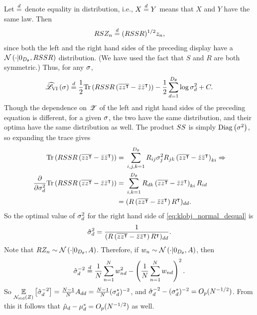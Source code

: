Let $\dequal$ denote equality in distribution, i.e., $X \dequal Y$ means that
$X$ and $Y$ have the same law.  Then
%
\begin{align*}
%
R S \z_n \dequal (RSSR)^{1/2} z_n,
%
\end{align*}
%
since both the left and the right hand sides of the preceding display have a
$\normal{\cdot}{\zerod[\thetadim], RSSR}$ distribution.  (We have used the fact that
$S$ and $R$ are both symmetric.)  Thus, for any $\etasigma$,
%
\begin{align}\label{eq:klobj_normal_dequal}
%
\klobj{\etasigma} \dequal
\frac{1}{2} \trace{R \sigmat \sigmat R \left(\zzbar - \zbar \zbar^\trans\right)}
-\frac{1}{2}\sumd \log \etasigma[d]^2 + \const.
%
\end{align}
%
Though the dependence on $\Z$ of the left and right hand sides of the preceding
equation is different, for a given $\etasigma$, the two have the same
distribution, and their optima have the same distribution as well.
The product $\sigmat \sigmat$ is simply $\diag{\etasigma^2}$, so
expanding the trace gives
%
\begin{align*}
%
\trace{R \sigmat \sigmat R \left(\zzbar - \zbar \zbar^\trans\right)}
={}&
\sum_{i,j,k=1}^{\thetadim} R_{ij} \etasigma[j]^2 R_{jk}
 \left(\zzbar - \zbar \zbar^\trans\right)_{ki} \Rightarrow \\
\frac{\partial}{\partial \etasigma[d]^2}
    \trace{R \sigmat \sigmat R \left(\zzbar - \zbar \zbar^\trans\right)}
    ={}&
\sum_{i,k=1}^{\thetadim} R_{dk}
     \left(\zzbar - \zbar \zbar^\trans\right)_{ki} R_{id}
    \\ ={}&
     (R \left(\zzbar - \zbar \zbar^\trans\right) R^\trans)_{dd}.
%
%
\end{align*}
%
So the optimal value of $\etasigma[d]^2$ for the right hand side of
\cref{eq:klobj_normal_dequal} is
%
\begin{align*}
%
\etasigmahat[d]^2 =
\frac{1}{(R \left(\zzbar - \zbar \zbar^\trans\right) R^\trans)_{dd}}.
%
\end{align*}
%
Note that $R \z_n \sim \normal{\cdot}{\zerod[\thetadim], A}$.  Therefore,
if $w_n \sim \normal{\cdot}{\zerod[\thetadim], A}$, then
%
\begin{align*}
%
\etasigmahat[d]^{-2}
\dequal
\meann w_{nd}^2 - \left(\meann w_{nd}\right)^2.
%
\end{align*}
%
So $\expect{\normz}{\etasigmahat[d]^{-2}} = \frac{N - 1}{N} A_{dd} =
\frac{N - 1}{N} (\etasigma[d]^{*})^{-2}$, and $\etasigmahat[d]^{-2} -
(\etasigma[d]^{*})^{-2}= O_p(N^{-1/2})$.  From this it follows that
$\etamuhat[d] - \etamu[d]^* = O_p(N^{-1/2})$ as well.




